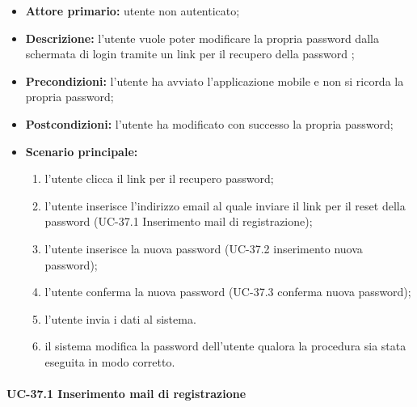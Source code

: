 	\begin{itemize}
		\item \textbf{Attore primario:} utente non autenticato;

		\item \textbf{Descrizione:} l'utente vuole poter modificare la propria password dalla schermata di login tramite un link per il recupero della password ;

		\item \textbf{Precondizioni:} l'utente ha avviato l'applicazione mobile e non si ricorda la propria password;

		\item \textbf{Postcondizioni:} l'utente ha modificato con successo la propria password;

		\item \textbf{Scenario principale:}
	  		\begin{enumerate}
		  		\item l'utente clicca il link per il recupero password; 
		  		\item l'utente inserisce l'indirizzo email al quale inviare il link per il reset della password (UC-37.1 Inserimento mail di registrazione);
		  		\item l'utente inserisce la nuova password (UC-37.2 inserimento nuova password);
		  		\item l'utente conferma la nuova password (UC-37.3 conferma nuova password);
		  		\item l'utente invia i dati al sistema.
		  		\item il sistema modifica la password dell'utente qualora la procedura sia stata eseguita in modo corretto.
	  		\end{enumerate}
	\end{itemize}

\paragraph{UC-37.1 Inserimento mail di registrazione}

